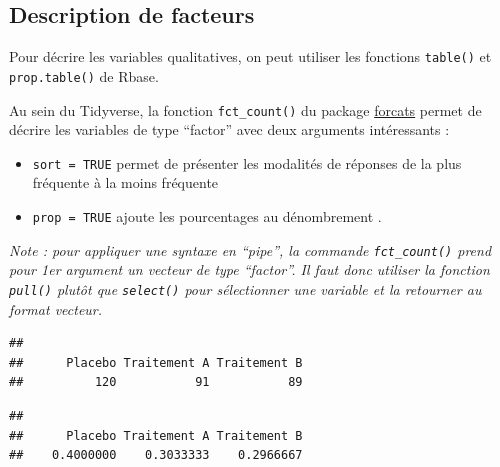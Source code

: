 \documentclass[
]{book}
\newenvironment{Shaded}{\begin{snugshade}}{\end{snugshade}}
\newcommand{\DocumentationTok}[1]{\textcolor[rgb]{0.56,0.35,0.01}{\textbf{\textit{#1}}}}
\newcommand{\FunctionTok}[1]{\textcolor[rgb]{0.13,0.29,0.53}{\textbf{#1}}}
\newcommand{\NormalTok}[1]{#1}
\newcommand{\SpecialCharTok}[1]{\textcolor[rgb]{0.81,0.36,0.00}{\textbf{#1}}}
\providecommand{\tightlist}{%
  \setlength{\itemsep}{0pt}\setlength{\parskip}{0pt}}
\begin{document}
\subsection{Description de facteurs}\label{description-de-facteurs}

Pour décrire les variables qualitatives, on peut utiliser les fonctions \texttt{table()} et \texttt{prop.table()} de Rbase.

Au sein du Tidyverse, la fonction \texttt{fct\_count()} du package \href{https://raw.githubusercontent.com/rstudio/cheatsheets/main/factors.pdf}{forcats} permet de décrire les variables de type ``factor'' avec deux arguments intéressants :

\begin{itemize}
\tightlist
\item
  \texttt{sort\ =\ TRUE} permet de présenter les modalités de réponses de la plus fréquente à la moins fréquente
\item
  \texttt{prop\ =\ TRUE} ajoute les pourcentages au dénombrement .
\end{itemize}

\emph{Note : pour appliquer une syntaxe en ``pipe'', la commande \texttt{fct\_count()} prend pour 1er argument un vecteur de type ``factor''. Il faut donc utiliser la fonction \texttt{pull()} plutôt que \texttt{select()} pour sélectionner une variable et la retourner au format vecteur.}

\begin{Shaded}
\end{Shaded}

\begin{verbatim}
## 
##      Placebo Traitement A Traitement B 
##          120           91           89
\end{verbatim}

\begin{Shaded}
\end{Shaded}

\begin{verbatim}
## 
##      Placebo Traitement A Traitement B 
##    0.4000000    0.3033333    0.2966667
\end{verbatim}
\end{document}

